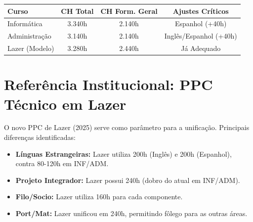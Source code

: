 \documentclass[a4paper,12pt]{article}
\begin{document}
\begin{center}
\small
\begin{tabular}{lccc}
\toprule
\textbf{Curso} & \textbf{CH Total} & \textbf{CH Form. Geral} & \textbf{Ajustes Críticos} \\ \midrule
Informática & 3.340h & 2.140h & Espanhol (+40h) \\
Administração & 3.140h & 2.140h & Inglês/Espanhol (+40h) \\
\rowcolor{gray!10} Lazer (Modelo) & 3.280h & 2.440h & Já Adequado \\ \bottomrule
\end{tabular}
\end{center}

\section{Referência Institucional: PPC Técnico em Lazer}
O novo PPC de Lazer (2025) serve como parâmetro para a unificação. Principais diferenças identificadas:

\begin{itemize}
    \item \textbf{Línguas Estrangeiras:} Lazer utiliza 200h (Inglês) e 200h (Espanhol), contra 80-120h em INF/ADM.
    \item \textbf{Projeto Integrador:} Lazer possui 240h (dobro do atual em INF/ADM).
    \item \textbf{Filo/Socio:} Lazer utiliza 160h para cada componente.
    \item \textbf{Port/Mat:} Lazer unificou em 240h, permitindo fôlego para as outras áreas.
\end{itemize}
\end{document}
